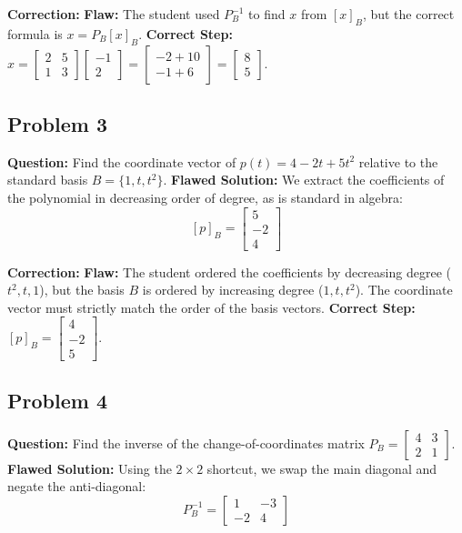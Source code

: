 \documentclass[11pt]{article}
\begin{document}
\textbf{Correction:}
\textbf{Flaw:} The student used $P_B^{-1}$ to find $x$ from $[x]_B$, but the correct formula is $x = P_B [x]_B$.
\textbf{Correct Step:} $x = \begin{bmatrix} 2 & 5 \\ 1 & 3 \end{bmatrix} \begin{bmatrix} -1 \\ 2 \end{bmatrix} = \begin{bmatrix} -2 + 10 \\ -1 + 6 \end{bmatrix} = \begin{bmatrix} 8 \\ 5 \end{bmatrix}$.

\subsection{Problem 3}
\textbf{Question:} Find the coordinate vector of $p(t) = 4 - 2t + 5t^2$ relative to the standard basis $B = \{1, t, t^2\}$.
\textbf{Flawed Solution:}
We extract the coefficients of the polynomial in decreasing order of degree, as is standard in algebra:
\[ [p]_B = \begin{bmatrix} 5 \\ -2 \\ 4 \end{bmatrix} \]

\textbf{Correction:}
\textbf{Flaw:} The student ordered the coefficients by decreasing degree ($t^2, t, 1$), but the basis $B$ is ordered by increasing degree ($1, t, t^2$). The coordinate vector must strictly match the order of the basis vectors.
\textbf{Correct Step:} $[p]_B = \begin{bmatrix} 4 \\ -2 \\ 5 \end{bmatrix}$.

\subsection{Problem 4}
\textbf{Question:} Find the inverse of the change-of-coordinates matrix $P_B = \begin{bmatrix} 4 & 3 \\ 2 & 1 \end{bmatrix}$.
\textbf{Flawed Solution:}
Using the $2 \times 2$ shortcut, we swap the main diagonal and negate the anti-diagonal:
\[ P_B^{-1} = \begin{bmatrix} 1 & -3 \\ -2 & 4 \end{bmatrix} \]
\end{document}
